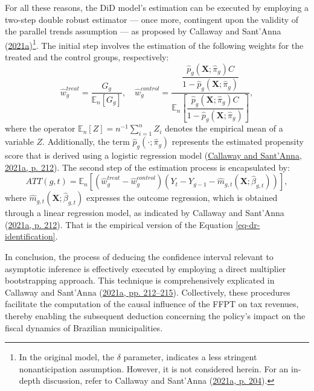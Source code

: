 \documentclass[12pt, a4paper, twoside]{article}
\numberwithin{equation}{subsection} %
\begin{document}
For all these reasons, the DiD model's estimation can be executed by
employing a two-step double robust estimator --- once more, contingent
upon the validity of the parallel trends assumption --- as proposed by
Callaway and Sant'Anna
(\protect\hyperlink{ref-CALLAWAY2021200}{2021a})\footnote{In the
  original model, the \(\delta\) parameter, indicates a less stringent
  nonanticipation assumption. However, it is not considered herein. For
  an in-depth discussion, refer to Callaway and Sant'Anna
  (\protect\hyperlink{ref-CALLAWAY2021200}{2021a, p. 204}).}. The
initial step involves the estimation of the following weights for the
treated and the control groups, respectively: \begin{equation*}
\widehat{w}_g^{treat} = \frac{G_g}{\mathbb{E}_n[G_g]}, \quad
\widehat{w}_g^{control} = \dfrac{ \dfrac{\widehat{p}_g(\boldsymbol{X}; \widehat{\pi}_g) C}{1 - \widehat{p}_g(\boldsymbol{X}; \widehat{\pi}_g)} }{\mathbb{E}_n \left[\dfrac{\widehat{p}_g(\boldsymbol{X}; \widehat{\pi}_g) C}{1 - \widehat{p}_g(\boldsymbol{X}; \widehat{\pi}_g)} \right]},
\end{equation*} where the operator
\(\mathbb{E}_n[Z] = n^{-1} \sum_{i=1}^n Z_i\) denotes the empirical mean
of a variable \(Z\). Additionally, the term
\(\widehat{p}_g(\cdot; \widehat{\pi}_g)\) represents the estimated
propensity score that is derived using a logistic regression model
(\protect\hyperlink{ref-CALLAWAY2021200}{Callaway and Sant'Anna, 2021a,
p. 212}). The second step of the estimation process is encapsulated by:
\begin{equation}
\label{eq-dr-estimation}
    \widehat{ATT}(g, t) = \mathbb{E}_n \left[ (\widehat{w}_g^{treat} - \widehat{w}_g^{control}) (Y_t - Y_{g-1} - \widehat{m}_{g,t}(\boldsymbol{X}; \widehat{\beta}_{g,t}) ) \right],
\end{equation} where
\(\widehat{m}_{g,t}(\boldsymbol{X}; \widehat{\beta}_{g,t})\) expresses
the outcome regression, which is obtained through a linear regression
model, as indicated by Callaway and Sant'Anna
(\protect\hyperlink{ref-CALLAWAY2021200}{2021a, p. 212}). That is the
empirical version of the Equation \eqref{eq-dr-identification}.

In conclusion, the process of deducing the confidence interval relevant
to asymptotic inference is effectively executed by employing a direct
multiplier bootstrapping approach. This technique is comprehensively
explicated in Callaway and Sant'Anna
(\protect\hyperlink{ref-CALLAWAY2021200}{2021a, pp. 212--215}).
Collectively, these procedures facilitate the computation of the causal
influence of the FFPT on tax revenues, thereby enabling the subsequent
deduction concerning the policy's impact on the fiscal dynamics of
Brazilian municipalities.
\end{document}
